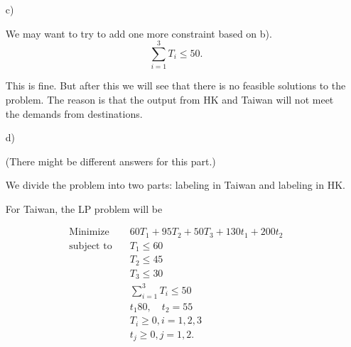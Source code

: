 \documentclass[12pt]{article}
\begin{document}
\begin{enumerate}
\item[c)]

We may want to try to add one more constraint based on b).
$$
\sum_{i = 1}^3 T_i \leqslant 50.
$$

This is fine. But after this we will see that there is no feasible solutions to the problem. The reason is that the output from HK and Taiwan will not meet the demands from destinations.



\item[d)]

(There might be different answers for this part.)

We divide the problem into two parts: labeling in Taiwan and labeling in HK.

For Taiwan, the LP problem will be

\begin{equation*}
\begin{aligned}
\text{Minimize} \quad &60T_1 + 95T_2 + 50 T_3 + 130t_1 + 200 t_2 \\
\text{subject\  to} \quad & T_1 \leqslant 60 \\
& T_2 \leqslant 45 \\
& T_3 \leqslant 30 \\
& \sum_{i = 1}^3 T_i \leqslant 50\\
& t_1  80, \quad  t_2 = 55 \\
& T_i \geqslant 0, i = 1, 2, 3 \\
& t_j \geqslant 0, j = 1, 2.
\end{aligned}
\end{equation*}








\end{enumerate}
\end{document}
